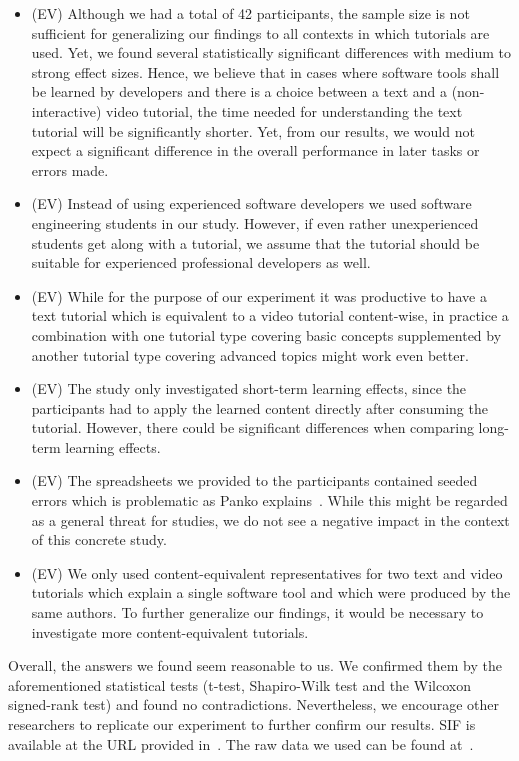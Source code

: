 \begin{itemize}
\item (EV) Although we had a total of 42 participants, the sample size is not sufficient for generalizing our findings to all contexts in which tutorials are used. Yet, we found several statistically significant differences with medium to strong effect sizes. Hence, we believe that in cases where software tools shall be learned by developers and there is a choice between a text and a (non-interactive) video tutorial, the time needed for understanding the text tutorial will be significantly shorter. Yet, from our results, we would not expect a significant difference in the overall performance in later tasks or errors made.
\item (EV) Instead of using experienced software developers we used software engineering students in our study. However, if even rather unexperienced students get along with a tutorial, we assume that the tutorial should be suitable for experienced professional developers as well.
\item (EV) While for the purpose of our experiment it was productive to have a text tutorial which is equivalent to a video tutorial content-wise, in practice a combination with one tutorial type covering basic concepts supplemented by another tutorial type covering advanced topics might work even better. 
\item (EV) The study only investigated short-term learning effects, since the participants had to apply the learned content directly after consuming the tutorial. However, there could be significant differences when comparing long-term learning effects.
\item (EV) The spreadsheets we provided to the participants contained seeded errors which is problematic as Panko explains~\cite{panko2}. While this might be regarded as a general threat for studies, we do not see a negative impact in the context of this concrete study.
\item (EV) We only used content-equivalent representatives for two text and video tutorials which explain a single software tool and which were produced by the same authors. To further generalize our findings, it would be necessary to investigate more content-equivalent tutorials.
\end{itemize}



Overall, the answers we found seem reasonable to us. We confirmed them by the aforementioned statistical tests (t-test, Shapiro-Wilk test and the Wilcoxon signed-rank test) and found no contradictions. Nevertheless, we encourage other researchers to replicate our experiment to further confirm our results.  SIF is available at the URL provided in~\cite{sifei}. The raw data we used can be found at~\cite{kulesz_daniel_2016_188896}.




